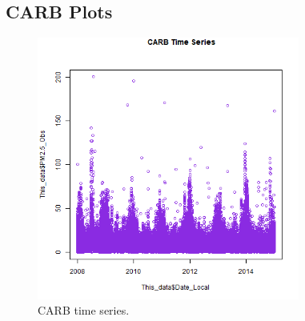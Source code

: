 
\subsection*{CARB Plots}
\begin{figure} 
\centering 
\includegraphics[width=0.77\textwidth]{Code_Outputs/CARB_time_series.png} 
\caption{\label{fig:CARBTS}CARB time series.} 
\end{figure} 
 
